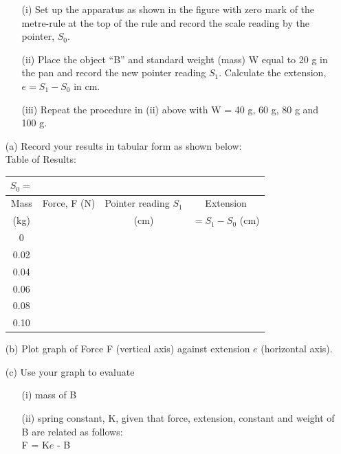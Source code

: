 \begin{itemize}
\item[]
\begin{itemize}
\item[(i)] Set up the apparatus as shown in the figure with zero mark of the metre-rule at the top of the rule and record the scale reading by the pointer, $S_0$.
\item[(ii)] Place the object ``B'' and standard weight (mass) W equal to 20 g in the pan and record the new pointer reading $S_1$. Calculate the extension, $e = S_1 - S_0$ in cm.
\item[(iii)] Repeat the procedure in (ii) above with W = 40 g, 60 g, 80 g and 100 g.
\end{itemize}
\item[(a)] Record your results in tabular form as shown below:\\
Table of Results:

\begin{tabular}{|p{2cm}|p{3cm}|p{3cm}|p{3cm}|}\cline{1-1}
\multicolumn{1}{|p{2cm}|}{$S_0 = $}&\multicolumn{2}{c}{} & \multicolumn{1}{p{2.5cm}}{} \\ \hline
\multicolumn{1}{|c|}{Mass} & \multicolumn{1}{c|}{Force, F (N)} & \multicolumn{1}{c|}{Pointer reading $S_1$} & \multicolumn{1}{c|}{Extension}\\
\multicolumn{1}{|c|}{(kg)} & \multicolumn{1}{c|}{} & \multicolumn{1}{c|}{(cm)} & \multicolumn{1}{c|}{$= S_1 - S_0$ (cm)}\\ \hline
\multicolumn{1}{|c|}{0} & \multicolumn{1}{c|}{} & \multicolumn{1}{c|}{} & \multicolumn{1}{c|}{}\\ 
\multicolumn{1}{|c|}{0.02} & \multicolumn{1}{c|}{} & \multicolumn{1}{c|}{} & \multicolumn{1}{c|}{}\\ 
\multicolumn{1}{|c|}{0.04} & \multicolumn{1}{c|}{} & \multicolumn{1}{c|}{} & \multicolumn{1}{c|}{}\\ 
\multicolumn{1}{|c|}{0.06} & \multicolumn{1}{c|}{} & \multicolumn{1}{c|}{} & \multicolumn{1}{c|}{}\\ 
\multicolumn{1}{|c|}{0.08} & \multicolumn{1}{c|}{} & \multicolumn{1}{c|}{} & \multicolumn{1}{c|}{}\\ 
\multicolumn{1}{|c|}{0.10} & \multicolumn{1}{c|}{} & \multicolumn{1}{c|}{} & \multicolumn{1}{c|}{}\\ \hline
\end{tabular}
\item[(b)] Plot graph of Force F (vertical axis) against extension $e$ (horizontal axis).
\item[(c)] Use your graph to evaluate
\begin{itemize}
\item[(i)] mass of B
\item[(ii)] spring constant, K, given that force, extension, constant and weight of B are related as follows:\\
F = K$e$ - B
\end{itemize}
\end{itemize}

